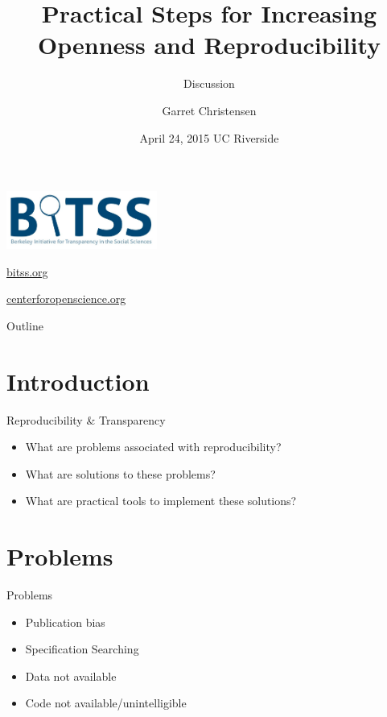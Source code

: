 \documentclass{beamer}
\title[Short Paper Title] %
{Practical Steps for Increasing Openness and Reproducibility}
\subtitle
{Discussion} %
\author[Christensen] %
{Garret Christensen\inst{1}}
\institute[UC Berkeley, Berkely Initiatiative for Transparency in the Social Sciences] %
{
  \inst{1}%
  UC Berkeley: Berkely Initiatiative for Transparency in the Social Sciences\\
  Center for Open Science
}
\date[Short Occasion] %
{April 24, 2015 UC Riverside}
\begin{document}


\begin{frame}
  \titlepage
\end{frame}

\begin{frame}
\includegraphics[height=0.75in]{BITSSlogo.PNG}

 \url{bitss.org}
 
 \url{centerforopenscience.org}
\end{frame}

\begin{frame}{Outline}
  \tableofcontents
\end{frame}


\section{Introduction}
\begin{frame}{Reproducibility \& Transparency}
\begin{itemize}
\item What are problems associated with reproducibility?
\item What are solutions to these problems?
\item What are practical tools to implement these solutions?
\end{itemize}
\end{frame}
\section{Problems}
\begin{frame}{Problems}
 \begin{itemize}
 \item Publication bias
 \item Specification Searching
 \item Data not available
 \item Code not available/unintelligible
 \end{itemize}
\end{frame}
\end{document}
